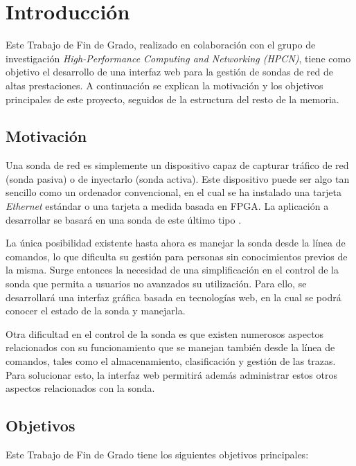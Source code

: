 \chapter{Introducción}

Este Trabajo de Fin de Grado, realizado en colaboración con el grupo de investigación \textit{High-Performance Computing and Networking (HPCN)}, tiene como objetivo el desarrollo de una interfaz web para la gestión de sondas de red de altas prestaciones.
A continuación se explican la motivación y los objetivos principales de este proyecto, seguidos de la estructura del resto de la memoria.

\section{Motivación}

Una sonda de red es simplemente un dispositivo capaz de capturar tráfico de red (sonda pasiva) o de inyectarlo (sonda activa).
Este dispositivo puede ser algo tan sencillo como un ordenador convencional, en el cual se ha instalado una tarjeta \textit{Ethernet} estándar o una tarjeta a medida basada en \gls{FPGA}.
La aplicación a desarrollar se basará en una sonda de este último tipo \cite{jfzazo}.

La única posibilidad existente hasta ahora es manejar la sonda desde la línea de comandos, lo que dificulta su gestión para personas sin conocimientos previos de la misma.
Surge entonces la necesidad de una simplificación en el control de la sonda que permita a usuarios no avanzados su utilización.
Para ello, se desarrollará una interfaz gráfica basada en tecnologías web, en la cual se podrá conocer el estado de la sonda y manejarla.

Otra dificultad en el control de la sonda es que existen numerosos aspectos relacionados con su funcionamiento que se manejan también desde la línea de comandos, tales como el almacenamiento, clasificación y gestión de las \glspl{traza}.
Para solucionar esto, la interfaz web permitirá además administrar estos otros aspectos relacionados con la sonda.

\section{Objetivos}

Este Trabajo de Fin de Grado tiene los siguientes objetivos principales:

